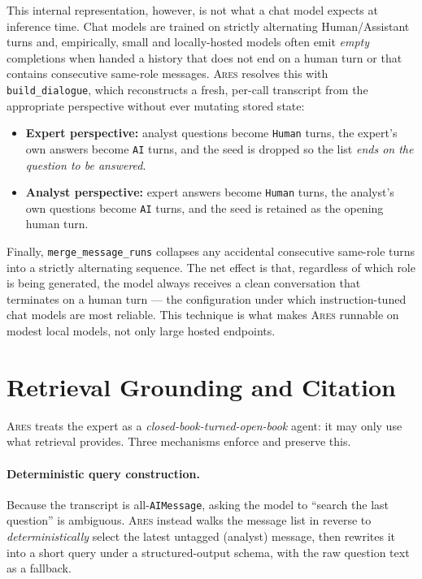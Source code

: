 \documentclass[10pt,twocolumn]{article}
\newcommand{\ares}{\textsc{Ares}}
\newcommand{\code}[1]{\texttt{\small #1}}
\begin{document}
This internal representation, however, is not what a chat model expects at
inference time. Chat models are trained on strictly alternating
Human/Assistant turns and, empirically, small and locally-hosted models often
emit \emph{empty} completions when handed a history that does not end on a human
turn or that contains consecutive same-role messages. \ares{} resolves this with
\code{build\_dialogue}, which reconstructs a fresh, per-call transcript from the
appropriate perspective without ever mutating stored state:

\begin{itemize}[leftmargin=1.2em,itemsep=1pt]
  \item \textbf{Expert perspective:} analyst questions become \code{Human} turns,
  the expert's own answers become \code{AI} turns, and the seed is dropped so the
  list \emph{ends on the question to be answered}.
  \item \textbf{Analyst perspective:} expert answers become \code{Human} turns,
  the analyst's own questions become \code{AI} turns, and the seed is retained as
  the opening human turn.
\end{itemize}

Finally, \code{merge\_message\_runs} collapses any accidental consecutive
same-role turns into a strictly alternating sequence. The net effect is that,
regardless of which role is being generated, the model always receives a clean
conversation that terminates on a human turn --- the configuration under which
instruction-tuned chat models are most reliable. This technique is what makes
\ares{} runnable on modest local models, not only large hosted endpoints.

\section{Retrieval Grounding and Citation}
\label{sec:grounding}

\ares{} treats the expert as a \emph{closed-book-turned-open-book} agent: it may
only use what retrieval provides. Three mechanisms enforce and preserve this.

\paragraph{Deterministic query construction.} Because the transcript is
all-\code{AIMessage}, asking the model to ``search the last question'' is
ambiguous. \ares{} instead walks the message list in reverse to
\emph{deterministically} select the latest untagged (analyst) message, then
rewrites it into a short query under a structured-output schema, with the raw
question text as a fallback.
\end{document}
